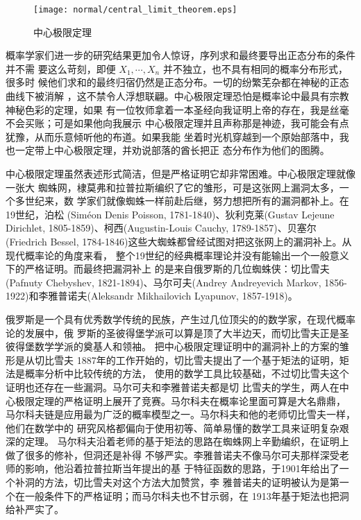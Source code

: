 \begin{figure}[bp]
\centering
\vspace{1cm}
\texttt{[image: normal/central\_limit\_theorem.eps]}
\caption{中心极限定理}
\end{figure}

概率学家们进一步的研究结果更加令人惊讶，序列求和最终要导出正态分布的条件并不需
要这么苛刻，即便 $X_1,\cdots, X_n$ 并不独立，也不具有相同的概率分布形式，很多时
候他们求和的最终归宿仍然是正态分布。一切的纷繁芜杂都在神秘的正态曲线下被消解
，这不禁令人浮想联翩。中心极限定理恐怕是概率论中最具有宗教神秘色彩的定理，如果
有一位牧师拿着一本圣经向我证明上帝的存在，我是丝毫不会买账；可是如果他向我展示
中心极限定理并且声称那是神迹，我可能会有点犹豫，从而乐意倾听他的布道。如果我能
坐着时光机穿越到一个原始部落中，我也一定带上中心极限定理，并劝说部落的酋长把正
态分布作为他们的图腾。

中心极限定理虽然表述形式简洁，但是严格证明它却非常困难。中心极限定理就像一张大
蜘蛛网，棣莫弗和拉普拉斯编织了它的雏形，可是这张网上漏洞太多，一个多世纪来，数
学家们就像蜘蛛一样前赴后继，努力想把所有的漏洞都补上。在19世纪，泊松
(Sim\'{e}on Denis Poisson, 1781-1840)、狄利克莱(Gustav Lejeune Dirichlet,
1805-1859)、柯西(Augustin-Louis Cauchy, 1789-1857)、贝塞尔(Friedrich Bessel,
1784-1846)这些大蜘蛛都曾经试图对把这张网上的漏洞补上。从现代概率论的角度来看，
整个19世纪的经典概率理论并没有能输出一个一般意义下的严格证明。而最终把漏洞补上
的是来自俄罗斯的几位蜘蛛侠：切比雪夫(Pafnuty Chebyshev, 1821-1894)、马尔可夫(Andrey Andreyevich Markov,
1856-1922)和李雅普诺夫(Aleksandr Mikhailovich Lyapunov, 1857-1918)。

俄罗斯是一个具有优秀数学传统的民族，产生过几位顶尖的的数学家，在现代概率论的发展中，俄
罗斯的圣彼得堡学派可以算是顶了大半边天，而切比雪夫正是圣彼得堡数学学派的奠基人和领袖。
把中心极限定理证明中的漏洞补上的方案的雏形是从切比雪夫
1887年的工作开始的，切比雪夫提出了一个基于矩法的证明，矩法是概率分析中比较传统的方法，
使用的数学工具比较基础，不过切比雪夫这个证明也还存在一些漏洞。马尔可夫和李雅普诺夫都是切
比雪夫的学生，两人在中心极限定理的严格证明上展开了竞赛。马尔科夫在概率论里面可算是大名鼎鼎，
马尔科夫链是应用最为广泛的概率模型之一。马尔科夫和他的老师切比雪夫一样，他们在数学中的
研究风格都偏向于使用初等、简单易懂的数学工具来证明复杂艰深的定理。
马尔科夫沿着老师的基于矩法的思路在蜘蛛网上辛勤编织，在证明上做了很多的修补，但洞还是补得
不够严实。李雅普诺夫不像马尔可夫那样深受老师的影响，他沿着拉普拉斯当年提出的基
于特征函数的思路，于1901年给出了一个补洞的方法，切比雪夫对这个方法大加赞赏，李
雅普诺夫的证明被认为是第一个在一般条件下的严格证明；而马尔科夫也不甘示弱，在
1913年基于矩法也把洞给补严实了。

